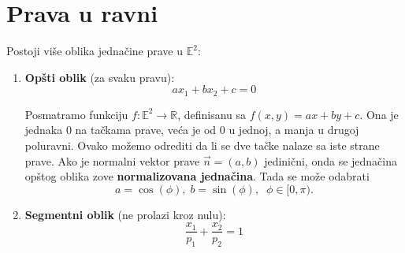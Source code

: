 \documentclass[a4paper,12pt,twoside]{report}
\numberwithin{algorithm}{section}
\begin{document}
\section{Prava u ravni}
Postoji više oblika jednačine prave u $\mathbb{E}^2$:
\begin{enumerate}
    \item \textbf{Opšti oblik} (za svaku pravu):
    \vfill
    \[ \boxed{ax_1 + bx_2 + c= 0} \]
    \vfill
    \begin{figure}[!h]
        \centering
    \end{figure}
    \vfill
    Posmatramo funkciju $f:\mathbb{E}^2 \to \mathbb{R}$, definisanu sa $f(x, y) = ax + by + c$. Ona je jednaka 0 na tačkama prave,
    veća je od 0 u jednoj, a manja u drugoj poluravni. Ovako možemo odrediti da li se dve tačke nalaze sa iste strane prave.
    \vfill
    Ako je normalni vektor prave $\vec{n} = (a, b)$ jedinični, onda se jednačina opštog oblika zove \textbf{normalizovana jednačina}.
    Tada se može odabrati \[ a = \cos (\phi), \; b = \sin (\phi), \;\; \phi \in [0, \pi). \]
    \vfill
    \newpage
\item \textbf{Segmentni oblik} (ne prolazi kroz nulu):
    \[ \boxed{\frac{x_1}{p_1} + \frac{x_2}{p_2} = 1} \]
    \begin{figure}[!h]
        \centering
        \begin{tikzpicture}[scale=1, >=Stealth, every node/.style={font=\normalsize}]
        

\end{tikzpicture}
\end{figure}
\end{enumerate}
\end{document}
